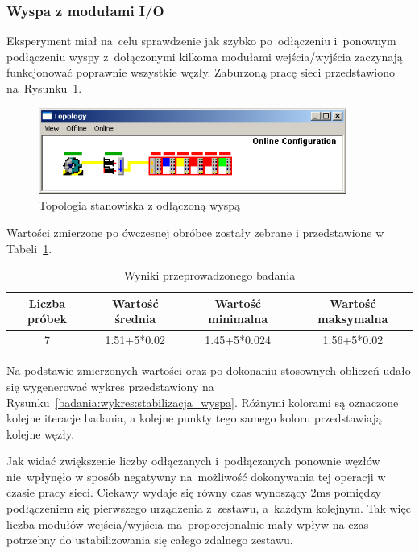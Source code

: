 \subsubsection{Wyspa z modułami I/O}
Eksperyment miał na~celu sprawdzenie jak szybko po~odłączeniu i~ponownym podłączeniu wyspy z~dołączonymi kilkoma modułami wejścia/wyjścia zaczynają funkcjonować poprawnie wszystkie węzły. Zaburzoną pracę sieci przedstawiono na~Rysunku~\ref{coupler}.
\begin{figure}[!htb] 	\centering 	\includegraphics[width=0.9\textwidth]{images/topologyCPerror} \caption{Topologia stanowiska z odłączoną wyspą} \label{coupler} \end{figure}

Wartości zmierzone po ówczesnej obróbce zostały zebrane i przedstawione w Tabeli~\ref{badania:wyniki:stabilizacja_wyspa}.
\begin{table}[!htb]
\begin{center}
\begin{tabular}{| c | c | c | c |}\hline
\textbf{Liczba próbek} & \textbf{Wartość średnia} & \textbf{Wartość minimalna} & \textbf{Wartość maksymalna} \\\hline\hline
7 & 1.51+5*0.02 & 1.45+5*0.024 & 1.56+5*0.02 \\\hline
\end{tabular}
\end{center}
\vspace*{-6mm}
  \caption{Wyniki przeprowadzonego badania}
	\label{badania:wyniki:stabilizacja_wyspa}
\end{table}
Na podstawie zmierzonych wartości oraz po dokonaniu stosownych obliczeń udało się wygenerować wykres przedstawiony na Rysunku~\ref{badania:wykres:stabilizacja_wyspa}. Różnymi kolorami są oznaczone kolejne iteracje badania, a kolejne punkty tego samego koloru przedstawiają kolejne węzły.


Jak widać zwiększenie liczby odłączanych i~podłączanych ponownie węzłów nie~wpłynęło w sposób negatywny na~możliwość dokonywania tej operacji w czasie pracy sieci. Ciekawy wydaje się równy czas wynoszący 2ms pomiędzy podłączeniem się pierwszego urządzenia z~zestawu, a~każdym kolejnym. Tak więc liczba modułów wejścia/wyjścia ma~proporcjonalnie mały wpływ na czas potrzebny do ustabilizowania się całego zdalnego zestawu.

